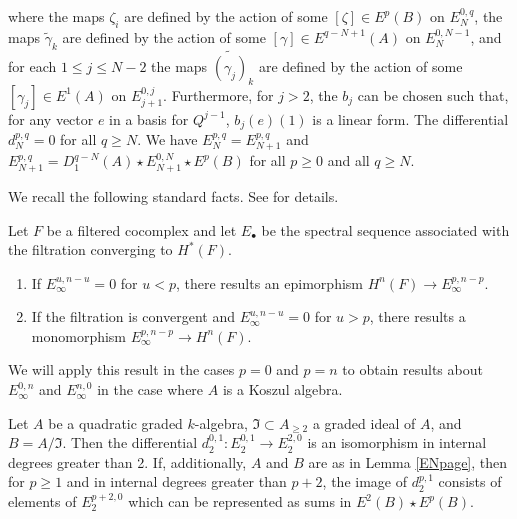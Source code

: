\documentclass[11pt,righttag]{amsart}
\begin{document}
\begin{lemma}
\begin{diagram}
\end{diagram}
where the maps ${\zeta}_i$ are defined by the action of some $[{\zeta}]\in E^p(B)$ on $E_N^{0,q}$, the maps $\widetilde{\gamma}_k$ are defined by the action of some $[{\gamma}]\in E^{q-N+1}(A)$ on $E_N^{0,N-1}$,  and for each $1\le j\le N-2$ the maps $\widetilde{({\gamma}_j)}_k$ are defined by the action of some $[{\gamma}_j]\in E^1(A)$ on $E_{j+1}^{0,j}$. Furthermore, for $j>2$, the $b_j$ can be chosen such that, for any vector $e$ in a basis for $Q^{j-1}$, $b_j(e)(1)$ is a linear form. The differential $d_N^{p,q}=0$ for all $q\ge N$. We have $E_N^{p,q}= E_{N+1}^{p,q}$ and  $E_{N+1}^{p,q}=D_1^{q-N}(A)\star E_{N+1}^{0,N}\star E^p(B)$ for all $p\ge 0$ and all $q\ge N$.
\end{lemma}

  We recall the following standard facts. See \cite{CE} for details.
  
  
  \begin{lemma}
  \label{Einfinity}
  Let $F$ be a filtered cocomplex and let $E_\bullet$ be the spectral sequence associated with the filtration converging to $H^*(F)$.  
  \begin{enumerate}
\item  If $E_{\infty}^{u,n-u}=0$ for $u<p$, there results an epimorphism $H^n(F)\rightarrow E_{\infty}^{p,n-p}$. 
\item If the filtration is convergent and $E_{\infty}^{u,n-u}=0$ for $u>p$, there results a monomorphism ${E_{\infty}^{p,n-p}\rightarrow H^n(F)}$.
\end{enumerate}
  \end{lemma}
  
  We will apply this result in the cases $p=0$ and $p=n$ to obtain results about $E_{\infty}^{0,n}$ and $E_{\infty}^{n,0}$ in the case where $A$ is a Koszul algebra.

  \begin{prop}
  \label{survivesToE3}
 Let $A$ be a quadratic graded $k$-algebra, ${\mathfrak{I}}\subset A_{\ge 2}$  a graded ideal of $A$, and $B=A/{\mathfrak{I}}$. Then the differential $d_2^{0,1}:E_2^{0,1}\rightarrow E_2^{2,0}$ is an isomorphism in internal degrees greater than 2. If, additionally, $A$ and $B$ are as in Lemma \ref{ENpage}, then for $p\ge 1$ and in internal degrees greater than $p+2$, the image of $d_2^{p,1}$ consists of elements of $E_2^{p+2,0}$ which can be represented as sums in $E^2(B)\star E^p(B)$.
  \end{prop}
  
\end{document}
